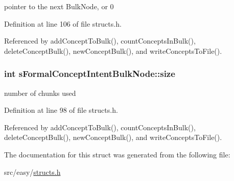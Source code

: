 pointer to the next \-Bulk\-Node, or 0 



\-Definition at line 106 of file structs.\-h.



\-Referenced by add\-Concept\-To\-Bulk(), count\-Concepts\-In\-Bulk(), delete\-Concept\-Bulk(), new\-Concept\-Bulk(), and write\-Concepts\-To\-File().

\hypertarget{structsFormalConceptIntentBulkNode_afc96b660c7becf5517e4391846e0975f}{
\subsubsection[{size}]{\setlength{\rightskip}{0pt plus 5cm}int {\bf s\-Formal\-Concept\-Intent\-Bulk\-Node\-::size}}}\label{structsFormalConceptIntentBulkNode_afc96b660c7becf5517e4391846e0975f}


number of chunks used 



\-Definition at line 98 of file structs.\-h.



\-Referenced by add\-Concept\-To\-Bulk(), count\-Concepts\-In\-Bulk(), delete\-Concept\-Bulk(), new\-Concept\-Bulk(), and write\-Concepts\-To\-File().



\-The documentation for this struct was generated from the following file\-:\begin{DoxyCompactItemize}
\item 
src/easy/\hyperlink{easy_2structs_8h}{structs.\-h}\end{DoxyCompactItemize}
